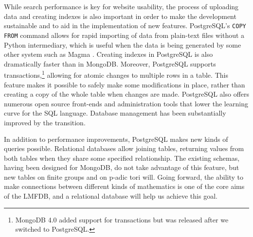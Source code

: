 \documentclass{article}
\begin{document}
While search performance is key for website usability, the process of uploading data and creating indexes is also important in order to make the development sustainable and to aid in the implementation of new features.
PostgreSQL's \texttt{COPY FROM} command allows for rapid importing of data from plain-text files without a Python intermediary, which is useful when the data is being generated by some other system such as Magma \cite{magma}.
Creating indexes in PostgreSQL is also dramatically faster than in MongoDB. 
Moreover, PostgreSQL supports transactions,\footnote{MongoDB 4.0 added support for transactions but was released after we switched to PostgreSQL.} allowing for atomic changes to multiple rows in a table.
This feature makes it possible to safely make some modifications in place, rather than creating a copy of the whole table when changes are made.
PostgreSQL also offers numerous open source front-ends and administration tools \cite{pgadmin,adminer} that lower the learning curve for the SQL language.
Database management has been substantially improved by the transition.

In addition to performance improvements, PostgreSQL makes new kinds of queries possible.
Relational databases allow joining tables, returning values from both tables when they share some specified relationship.
The existing schemas, having been designed for MongoDB, do not take advantage of this feature, but new tables on finite groups and on p-adic tori will.
Going forward, the ability to make connections between different kinds of mathematics is one of the core aims of the LMFDB, and a relational database will help us achieve this goal.
\end{document}
